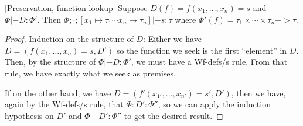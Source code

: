 \documentclass[a4paper, oneside, 10pt, draft]{memoir}
\begin{document}
\begin{lem}{[Preservation, function lookup]}
  \label{lem:preservation-lookup}
  Suppose $D(f) = f(x_1, \dotsc, x_n) = s$ and $\Phi |- D :
  \Phi'$. Then $\Phi;\cdot;[x_1 \mapsto \tau_1 \dotsb x_n \mapsto
  \tau_n] |- s : \tau$ where $\Phi'(f) = \tau_1 \times \dotsb \times
  \tau_n -> \tau$.
\end{lem}
\begin{proof}
  Induction on the structure of $D$: Either we have $D = (f(x_1,
  \dotsc, x_n) = s, D')$ so the function we seek is the first
  ``element'' in $D$. Then, by the structure of $\Phi |- D : \Phi'$,
  we must have a Wf-defs/s rule. From that rule, we have exactly what
  we seek as premises.

  If on the other hand, we have $D = (f'(x_{1'}, \dotsc, x_{n'}) = s',
  D')$, then we have, again by the Wf-defs/s rule, that $\Phi : D' :
  \Phi''$, so we can apply the induction hypothesis on $D'$ and $\Phi
  |- D' : \Phi''$ to get the desired result.
\end{proof}
\end{document}
